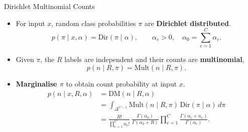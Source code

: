 \begin{frame}{Dirichlet Multinomial Counts}
\label{frm:appendix-dirichlet-multinomial-distribution}
\setlength{\abovedisplayskip}{5pt}
\setlength{\belowdisplayskip}{5pt}
\begin{itemize}
\setlength{\itemsep}{3mm}
\item For input $x$, random class probabilities $\pi$ are \textbf{Dirichlet distributed}.
\[
p(\pi\mid x,\alpha)=\mathrm{Dir}(\pi\mid\alpha),
\qquad \alpha_c>0,\quad \alpha_0=\sum_{c=1}^{C}\alpha_c.
\]
\item Given $\pi$, the $R$ labels are independent and their counts are \textbf{multinomial},
\[
p(n\mid R,\pi)=\mathrm{Mult}(n\mid R,\pi).
\]
\item \textbf{Marginalise $\pi$} to obtain count probability at input $x$.
\[
\begin{aligned}
p(n\mid x,R,\alpha)
&=\mathrm{DM}(n\mid R,\alpha)\\[1mm]
&=\int_{\Delta^{C-1}}\mathrm{Mult}(n\mid R,\pi)\,\mathrm{Dir}(\pi\mid\alpha)\,d\pi\\[2mm]
&=\frac{R!}{\prod_{c=1}^{C}n_c!}\,
\frac{\Gamma(\alpha_0)}{\Gamma(\alpha_0+R)}
\prod_{c=1}^{C}\frac{\Gamma(\alpha_c+n_c)}{\Gamma(\alpha_c)}.
\end{aligned}
\]
\end{itemize}
\end{frame}

